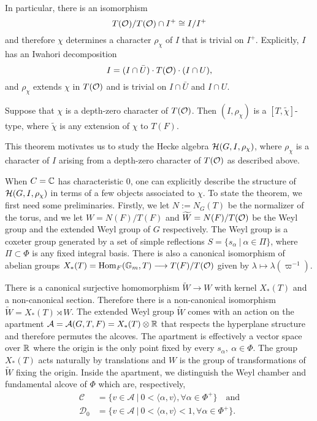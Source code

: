     In particular, there is an isomorphism
    $$T(\mathcal{O})/T(\mathcal{O})\cap I^+\cong I/I^+$$
    and therefore $\chi$ determines a character $\rho_\chi$ of $I$ that is trivial on $I^+$. Explicitly, $I$ has an Iwahori decomposition $$I=(I\cap\bar U)\cdot T(\mathcal{O})\cdot(I\cap U),$$
    and $\rho_\chi$ extends $\chi$ in $T(\mathcal{O})$ and is trivial on $I\cap\bar U$ and $I\cap U$.

    \begin{theorem}
        Suppose that $\chi$ is a depth-zero character of $T(\mathcal{O})$. Then $(I,\rho_\chi)$ is a $[T,\tilde\chi]$-type, where $\tilde\chi$ is any extension of $\chi$ to $T(F)$.
    \end{theorem}

    This theorem motivates us to study the Hecke algebra $\mathcal{H}(G,I,\rho_\chi)$, where $\rho_\chi$ is a character of $I$ arising from a depth-zero character of $T(\mathcal{O})$ as described above. 

    When $C=\mathbb{C}$ has characteristic $0$, one can explicitly describe the structure of $\mathcal{H}(G,I,\rho_{\chi})$ in terms of a few objects associated to $\chi$. To state the theorem, we first need some preliminaries. Firstly, we let $N:=N_G(T)$ be the normalizer of the torus, and we let $W=N(F)/T(F)$ and $\widetilde{W}=N(F)/T(\mathcal{O})$ be the Weyl group and the extended Weyl group of $G$ respectively. The Weyl group is a coxeter group generated by a set of simple reflections $S=\{s_\alpha\ |\ \alpha\in\Pi\}$, where $\Pi\subset\Phi$ is any fixed integral basis. There is also a canonical isomorphism of abelian groups $X_*(T)=\mathrm{Hom}_F(\mathbb{G}_m,T)\longrightarrow T(F)/T(\mathcal{O})$ given by $\lambda\mapsto\lambda(\varpi^{-1})$.
    
    There is a canonical surjective homomorphism $\widetilde{W}\rightarrow W$ with kernel $X_*(T)$ and a non-canonical section. Therefore there is a non-canonical isomorphism $\widetilde{W}=X_*(T)\rtimes W$. The extended Weyl group $\widetilde{W}$ comes with an action on the apartment $\mathcal{A}=\mathcal{A}(G,T,F)=X_*(T)\otimes\mathbb{R}$ that respects the hyperplane structure and therefore permutes the alcoves. The apartment is effectively a vector space over $\mathbb{R}$ where the origin is the only point fixed by every $s_\alpha,\ \alpha\in\Phi$. The group $X_*(T)$ acts naturally by translations and $W$ is the group of transformations of $\widetilde{W}$ fixing the origin. Inside the apartment, we distinguish the Weyl chamber and fundamental alcove of $\Phi$ which are, respectively,
    \begin{align*}
        \mathcal{C}&=\{v\in\mathcal{A}\ |\ 0<\langle\alpha,v\rangle,\forall\alpha\in\Phi^+\}\quad\text{and}\\
        \mathcal{D}_0&=\{v\in\mathcal{A}\ |\ 0<\langle\alpha,v\rangle<1,\forall\alpha\in\Phi^+\}.
    \end{align*}

